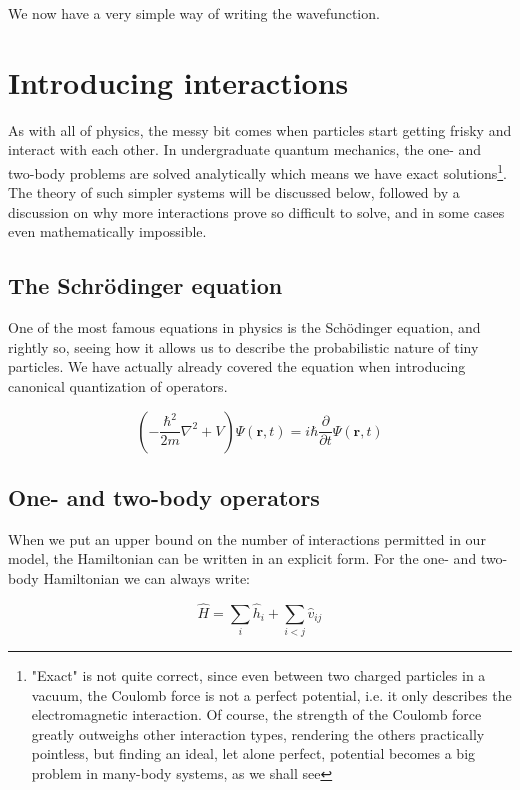 \documentclass[10pt]{report}
\begin{document}
	We now have a very simple way of writing the wavefunction. 
	
	\section{Introducing interactions}
	As with all of physics, the messy bit comes when particles start getting frisky and interact with each other. In undergraduate quantum mechanics, the one- and two-body problems are solved analytically which means we have exact solutions\footnote{"Exact" is not quite correct, since even between two charged particles in a vacuum, the Coulomb force is not a perfect potential, i.e. it only describes the electromagnetic interaction. Of course, the strength of the Coulomb force greatly outweighs other interaction types, rendering the others practically pointless, but finding an ideal, let alone perfect, potential becomes a big problem in many-body systems, as we shall see}. The theory of such simpler systems will be discussed below, followed by a discussion on why more interactions prove so difficult to solve, and in some cases even mathematically impossible.
	
	\subsection{The Schr\"odinger equation}
	One of the most famous equations in physics is the Sch\"odinger equation, and rightly so, seeing how it allows us to describe the probabilistic nature of tiny particles. We have actually already covered the equation when introducing canonical quantization of operators.
	
	\begin{equation}
		\left(-\frac{\hbar^2}{2m}\nabla^2 + V\right)\Psi(\bm{r},t) = i\hbar\frac{\partial}{\partial t}\Psi(\bm{r},t)
	\end{equation}
	
	\subsection{One- and two-body operators}
	When we put an upper bound on the number of interactions permitted in our model, the Hamiltonian can be written in an explicit form. For the one- and two-body Hamiltonian we can always write:
	
	\begin{equation}
		\hat{H} = \sum_i \hat{h}_i + \sum_{i<j} \hat{v}_{ij}
	\end{equation}
	
\end{document}
